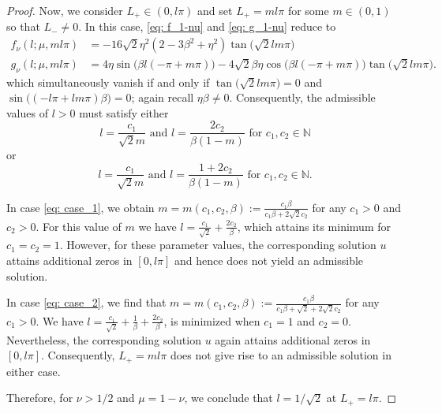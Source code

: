 \documentclass{article}
\numberwithin{equation}{section}
\begin{document}
\begin{proof}
			Now, we consider $L_+\in(0,l\pi)$ and set $L_+ = m l \pi$ for some $m\in(0,1)$ so that $L_- \neq 0$. In this case, \eqref{eq: f_1-nu} and \eqref{eq: g_1-nu} reduce to  
			\begin{equation*} 
				\begin{aligned}
					f_\nu (l; \mu,m l\pi) &=-16\sqrt{2}\eta^2  \left(2 -3\beta^2 + \eta^2\right) \tan\big(\sqrt{2} l m \pi\big)
					 \\
					g_\nu (l; \mu,m l\pi) &= 4\eta \sin\big(\beta l(-\pi + m\pi)\big)
					-4\sqrt{2}\beta\eta \cos\big(\beta l(-\pi + m\pi)\big)\tan\big(\sqrt{2}lm\pi\big).
				\end{aligned}
			\end{equation*}
			which  
			simultaneously vanish if and only if $\tan\big(\sqrt{2} l m \pi\big) =0$ and $\sin\big((-l\pi + lm\pi)\beta\big)=0$; again recall $\eta\beta\neq 0$.  
			Consequently, the admissible values of $l>0$ must satisfy either
			\begin{equation} \label{eq: case_1}
				l = \frac{c_1}{\sqrt{2}m} \text{ and } l = \frac{2 c_2}{\beta(1-m)} \text{ for } c_1,c_2 \in \mathbb{N}
			\end{equation}
			or 
			\begin{equation}\label{eq: case_2}
				l = \frac{c_1}{\sqrt{2}m} \text{ and } l = \frac{1+2c_2}{\beta(1-m)} \text{ for } c_1,c_2 \in \mathbb{N}.
			\end{equation}
			
			In case \eqref{eq: case_1}, we obtain $m=m (c_1,c_2,\beta) := \frac{c_1 \beta}{c_1 \beta +2 \sqrt{2} c_2}$ for any $c_1 > 0$ and $c_2 > 0$.
			For this value of $m$ we have $l = \frac{c_1}{\sqrt{2}} + \frac{2c_2}{\beta}$, which attains its minimum for $c_1 = c_2 = 1$. However, for these parameter values,  the corresponding solution $u$ attains  additional zeros in $[0,l\pi]$ and hence does not yield an admissible solution. 		
				
			In case \eqref{eq: case_2}, we find that $m=m (c_1,c_2,\beta) := \frac{c_1 \beta}{c_1 \beta +\sqrt{2} +2 \sqrt{2}c_2 }$ for any $c_1 > 0$. 
			We have 
			$l = \frac{c_1}{\sqrt{2}} + \frac{1}{\beta} + \frac{2 c_2}{\beta}$, is minimized when $c_1 =1$ and $c_2 =0$. Nevertheless,  the corresponding solution $u$ again attains  additional zeros in $[0,l\pi]$.  Consequently, $L_+=ml\pi$ does not give rise to an admissible solution in either case.
			 
			
			Therefore, for $\nu>1/2$ and $\mu=1-\nu$, we conclude that $l =1/\sqrt{2}$  at $L_+=l\pi$. 
		\end{proof}
\end{document}
